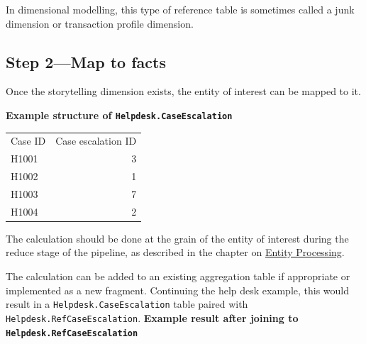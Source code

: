\documentclass[10pt,openany,10pt]{book}
\newcounter{none}
\let\podeToprule\toprule
\let\podeMidrule\midrule
\let\podeBottomrule\bottomrule
\renewcommand{\toprule}{\arrayrulecolor{pbiGrid}\podeToprule}
\renewcommand{\midrule}{\arrayrulecolor{pbiGrid}\podeMidrule}
\renewcommand{\bottomrule}{\arrayrulecolor{pbiGrid}\podeBottomrule}
\begin{document}
In dimensional modelling, this type of reference table is sometimes
called a junk dimension or transaction profile dimension.

\subsection{Step 2---Map to facts}\label{step-2map-to-facts}

Once the storytelling dimension exists, the entity of interest can be
mapped to it.

\textbf{Example structure of \texttt{Helpdesk.CaseEscalation}}

{\def\LTcaptype{none} %
\begin{longtable}[]{@{}lr@{}}
\toprule\noalign{}
Case ID & Case escalation ID \\
\midrule\noalign{}
\endhead
\bottomrule\noalign{}
\endlastfoot
H1001 & 3 \\
H1002 & 1 \\
H1003 & 7 \\
H1004 & 2 \\
\end{longtable}
}

The calculation should be done at the grain of the entity of interest
during the reduce stage of the pipeline, as described in the chapter on
\hyperref[docs-creating-information-entity-processing]{Entity
Processing}.

The calculation can be added to an existing aggregation table if
appropriate or implemented as a new fragment. Continuing the help desk
example, this would result in a \texttt{Helpdesk.CaseEscalation} table
paired with \texttt{Helpdesk.RefCaseEscalation}. \textbf{Example result
after joining to \texttt{Helpdesk.RefCaseEscalation}}
\end{document}
